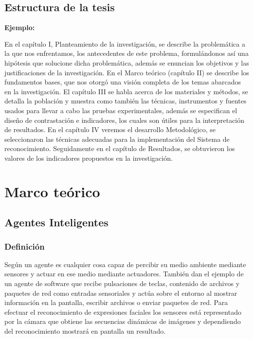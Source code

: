 \section{Estructura de la tesis}

{\bf Ejemplo:}\par
\vskip 0.1cm
En el capítulo I, Planteamiento de la investigación, se describe la problemática a la que nos enfrentamos, los antecedentes de este problema, formulándonos así una hipótesis que solucione dicha problemática, además se enuncian los objetivos y las justificaciones de la investigación. En el Marco teórico (capítulo II) se describe los fundamentos bases, que nos otorgó una visión completa de los temas abarcados en la investigación. El capítulo III se habla acerca de los materiales y métodos, se detalla la población y muestra como también las técnicas, instrumentos y fuentes usados para llevar a cabo las pruebas experimentales, además se especifican el diseño de contrastación e indicadores, los cuales son útiles para la interpretación de resultados. En el capítulo IV veremos el desarrollo Metodológico, se seleccionaron las técnicas adecuadas para la implementación del Sistema de reconocimiento. Seguidamente en el capítulo de Resultados, se obtuvieron los valores de los indicadores propuestos en la investigación.


\chapter{Marco teórico}

\section{Agentes Inteligentes}
\subsection{Definición}

Según \cite{Russel} un agente es cualquier cosa capaz de percibir su medio ambiente mediante sensores y actuar en ese medio mediante actuadores. También dan el ejemplo de  un agente de software que recibe pulsaciones de teclas, contenido de archivos y paquetes de red como entradas sensoriales y actúa sobre el entorno al mostrar información en la pantalla, escribir archivos o enviar paquetes de red. Para efectuar el reconocimiento de expresiones faciales los sensores está representado por la cámara que obtiene las secuencias dinámicas de imágenes y dependiendo del reconocimiento mostrará en pantalla un resultado.

